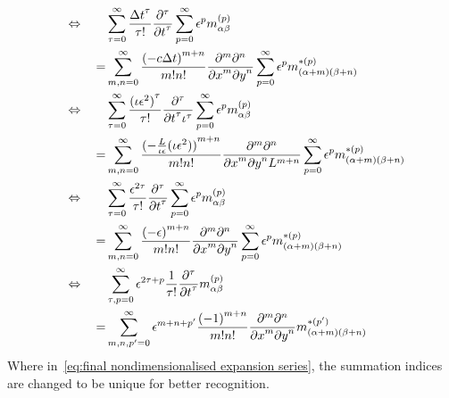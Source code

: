 \begin{align}
  \phantom{\equivalent\qquad}
  &\begin{aligned}
  \nonumber
    \mathllap{\equivalent\qquad} & \sum_{\tau = 0}^\infty \frac{{\Delta t}^\tau }{\tau!}  \frac{\partial^\tau}{{\partial t}^\tau} \sum_{p=0}^{\infty} \epsilon^p m_{\alpha\beta}^{(p)} \\
    = &{}\sum_{m,n = 0}^\infty \frac{{(-c\Delta t)}^{m+n}} {m!n!} \frac{\partial^m \partial^n}{ {\partial x}^m{\partial y}^n} \sum_{p=0}^{\infty} \epsilon^p m_{(\alpha + m)(\beta + n)}^{*(p)}
  \end{aligned}\\
  &\begin{aligned}
    \label{eq:nondimensionalised expansion series}
    \mathllap{\equivalent\qquad} &
    \sum_{\tau = 0}^\infty \frac{{(\iota\epsilon^2)}^\tau }{\tau!} \frac{\partial^\tau}{{\partial t}^\tau \iota^\tau} \sum_{p=0}^{\infty} \epsilon^p m_{\alpha\beta}^{(p)} \\
    = &{}\sum_{m,n = 0}^\infty \frac{{(-\frac{L}{\iota\epsilon}(\iota\epsilon^2))}^{m+n}} {m!n!}
    \frac{\partial^m \partial^n}{ {\partial x}^m{\partial y}^n L^{m+n}} \sum_{p=0}^{\infty} \epsilon^p m_{(\alpha + m)(\beta + n)}^{*(p)}
  \end{aligned} \\
  &\begin{aligned}
  \nonumber
    \mathllap{\equivalent\qquad} &
    \sum_{\tau = 0}^\infty \frac{\epsilon^{2\tau} }{\tau!} \frac{\partial^\tau}{{\partial t}^\tau} \sum_{p=0}^{\infty} \epsilon^p m_{\alpha\beta}^{(p)} \\
    = &{}\sum_{m,n = 0}^\infty \frac{{(-\epsilon)}^{m+n}} {m!n!}
    \frac{\partial^m \partial^n}{ {\partial x}^m{\partial y}^n } \sum_{p=0}^{\infty} \epsilon^p m_{(\alpha + m)(\beta + n)}^{*(p)}
  \end{aligned} \\
  &\begin{aligned}
    \label{eq:final nondimensionalised expansion series}
    \mathllap{\equivalent\qquad} &
    \sum_{\tau, p = 0}^\infty\epsilon^{2\tau + p} \frac{1} {\tau!} \frac{\partial^\tau}{{\partial t}^\tau} m_{\alpha\beta}^{(p)} \\
    = &{} \sum_{m,n,p' = 0}^\infty  \epsilon^{m+n+p'} \frac{{(-1)}^{m+n}} {m!n!}
    \frac{\partial^m \partial^n}{ {\partial x}^m{\partial y}^n } m_{(\alpha + m)(\beta + n)}^{*(p')}
  \end{aligned}
\end{align}
Where in~\eqref{eq:final nondimensionalised expansion series}, the summation indices are changed to be unique for better recognition.

